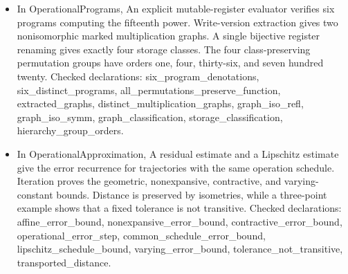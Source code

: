 \documentclass[11pt,a4paper]{article}
\newcommand{\lean}[1]{{\ttfamily\small
  \let\leanunderscore\_\def\_{\leanunderscore\allowbreak}#1}}
\begin{document}
\begin{itemize}[leftmargin=1.4em,itemsep=1pt]
{Checked declarations: \lean{stable\_stage\_exact}, \lean{stable\_stage\_card}, \lean{bit\_monoid\_card}, \lean{bit\_relations}, \lean{bit\_bijections}, \lean{bit\_composition\_table}, \lean{bit\_all\_transformations}, \lean{record\_monoid\_card}, \lean{extended\_monoid\_card}, \lean{extension\_preserves\_generators}, \lean{record\_receiver\_closure}, \lean{receiver\_reversibility}, \lean{receiver\_observations\_separate}, \lean{receiver\_future\_eq}, \lean{bypass\_future\_eq}, \lean{record\_future\_eq}, \lean{controlled\_boolean\_involution}, \lean{controlled\_boolean\_readout}, \lean{controlled\_boolean\_nonidentity}, \lean{controlled\_boolean\_two\_elements}, \lean{receiver\_recoding\_nontrivial}, \lean{operation\_conjugacy}, \lean{counter\_parity\_and\_carry}, \lean{counter\_and\_independent\_orders}, \lean{parity\_counter\_order}, \lean{distinct\_order\_two\_actions}, \lean{commutator\_and}, \lean{nonidentity\_can\_fix\_readout}, \lean{regular\_action\_detects}, \lean{action\_matrix\_composition}, \lean{action\_matrix\_injective}, \lean{action\_algebra\_basis}, \lean{bit\_matrix\_dependence}, \lean{bit\_algebra\_not\_injective}, \lean{affine\_bit\_recoding}, \lean{affine\_bit\_encoding}.\par}
\item {\raggedright In \lean{OperationalPrograms}, An explicit mutable-register evaluator verifies six programs computing the fifteenth power. Write-version extraction gives two nonisomorphic marked multiplication graphs. A single bijective register renaming gives exactly four storage classes. The four class-preserving permutation groups have orders one, four, thirty-six, and seven hundred twenty.
Checked declarations: \lean{six\_program\_denotations}, \lean{six\_distinct\_programs}, \lean{all\_permutations\_preserve\_function}, \lean{extracted\_graphs}, \lean{distinct\_multiplication\_graphs}, \lean{graph\_iso\_refl}, \lean{graph\_iso\_symm}, \lean{graph\_classification}, \lean{storage\_classification}, \lean{hierarchy\_group\_orders}.\par}
\item {\raggedright In \lean{OperationalApproximation}, A residual estimate and a Lipschitz estimate give the error recurrence for trajectories with the same operation schedule. Iteration proves the geometric, nonexpansive, contractive, and varying-constant bounds. Distance is preserved by isometries, while a three-point example shows that a fixed tolerance is not transitive.
Checked declarations: \lean{affine\_error\_bound}, \lean{nonexpansive\_error\_bound}, \lean{contractive\_error\_bound}, \lean{operational\_error\_step}, \lean{common\_schedule\_error\_bound}, \lean{lipschitz\_schedule\_bound}, \lean{varying\_error\_bound}, \lean{tolerance\_not\_transitive}, \lean{transported\_distance}.\par}

\end{itemize}
\end{document}
